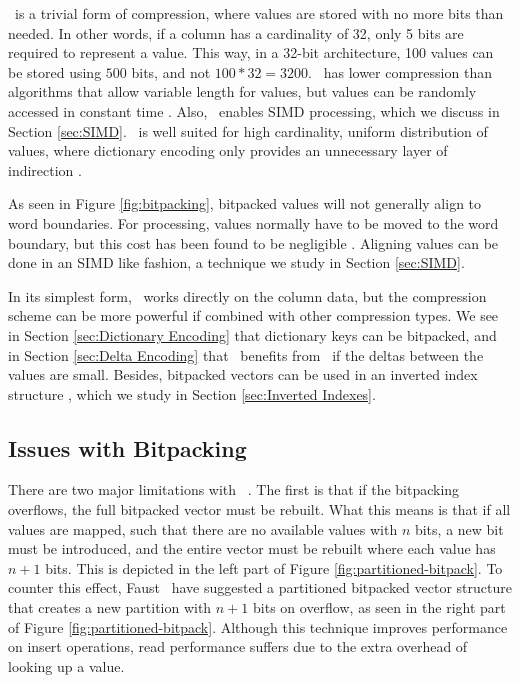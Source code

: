 \bp~is a trivial form of compression, where values are stored with no more bits than needed. In other words, if a column has a cardinality of 32, only 5 bits are required to represent a value. This way, in a 32-bit architecture, 100 values can be stored using $500$ bits, and not $100*32 = 3200$. \bp~has lower compression than algorithms that allow variable length for values, but values can be randomly accessed in constant time \cite{Raman2008-gi, Willhalm2013-ri}. Also, \bp~enables SIMD processing, which we discuss in Section \ref{sec:SIMD}. \bp~is well suited for high cardinality, uniform distribution of values, where dictionary encoding only provides an unnecessary layer of indirection \cite{Holloway2008-rr}.

As seen in Figure \ref{fig:bitpacking}, bitpacked values will not generally align to word boundaries. For processing, values normally have to be moved to the word boundary, but this cost has been found to be negligible \cite{Holloway2008-rr}. Aligning values can be done in an SIMD like fashion, a technique we study in Section \ref{sec:SIMD}.

In its simplest form, \bp~works directly on the column data, but the compression scheme can be more powerful if combined with other compression types. We see in Section \ref{sec:Dictionary Encoding} that dictionary keys can be bitpacked, and in Section \ref{sec:Delta Encoding} that \dele~benefits from \bp~if the deltas between the values are small. Besides, bitpacked vectors can be used in an inverted index structure \cite{Schwalb2014-hn}, which we study in Section \ref{sec:Inverted Indexes}.

\subsection{Issues with Bitpacking}
\label{sub:Issues with Bitpacking}
There are two major limitations with \bp~\cite{Faust2015-ke}. The first is that if the bitpacking overflows, the full bitpacked vector must be rebuilt. What this means is that if all values are mapped, such that there are no available values with $n$ bits, a new bit must be introduced, and the entire vector must be rebuilt where each value has $n + 1$ bits. This is depicted in the left part of Figure \ref{fig:partitioned-bitpack}. To counter this effect, Faust \ea~have suggested a partitioned bitpacked vector structure that creates a new partition with $n + 1$ bits on overflow, as seen in the right part of Figure \ref{fig:partitioned-bitpack}. Although this technique improves performance on insert operations, read performance suffers due to the extra overhead of looking up a value.

